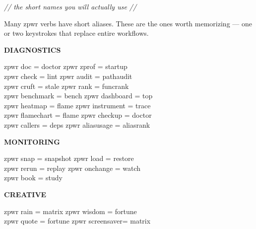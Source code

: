 \documentclass[11pt,a4paper,twoside]{book}
\begin{document}
{\small\itshape\color{dimtext} // the short names you will actually use //}

Many zpwr verbs have short aliases. These are the ones worth memorizing — one or two keystrokes that replace entire workflows.


\vspace{12pt}
{\bfseries\color{neonyellow} DIAGNOSTICS}\vspace{4pt}

\begin{codebox}
\color{neongreen}zpwr doc          = doctor       zpwr zprof      = startup\\
\color{neongreen}zpwr check        = lint         zpwr audit      = pathaudit\\
\color{neongreen}zpwr cruft        = stale        zpwr rank       = funcrank\\
\color{neongreen}zpwr benchmark    = bench        zpwr dashboard  = top\\
\color{neongreen}zpwr heatmap      = flame        zpwr instrument = trace\\
\color{neongreen}zpwr flamechart   = flame        zpwr checkup    = doctor\\
\color{neongreen}zpwr callers      = deps         zpwr aliasusage = aliasrank\\
\end{codebox}


\vspace{12pt}
{\bfseries\color{neonyellow} MONITORING}\vspace{4pt}

\begin{codebox}
\color{neongreen}zpwr snap         = snapshot     zpwr load       = restore\\
\color{neongreen}zpwr rerun        = replay       zpwr onchange   = watch\\
\color{neongreen}zpwr book         = study\\
\end{codebox}


\vspace{12pt}
{\bfseries\color{neonyellow} CREATIVE}\vspace{4pt}

\begin{codebox}
\color{neongreen}zpwr rain         = matrix       zpwr wisdom     = fortune\\
\color{neongreen}zpwr quote        = fortune      zpwr screensaver= matrix\\
\end{codebox}
\end{document}
